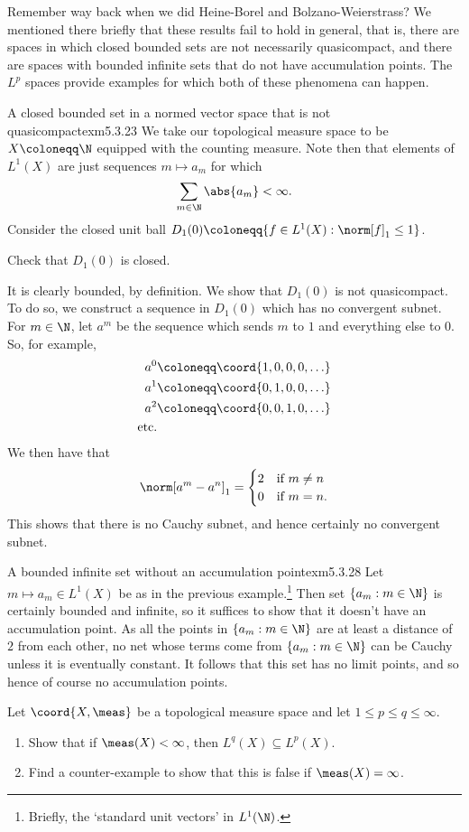 Remember way back when we did Heine-Borel and Bolzano-Weierstrass?  We mentioned there briefly that these results fail to hold in general, that is, there are spaces in which closed bounded sets are not necessarily quasicompact, and there are spaces with bounded infinite sets that do not have accumulation points.  The $L^p$ spaces provide examples for which both of these phenomena can happen.
\begin{exm}{A closed bounded set in a normed vector space that is not quasicompact}{exm5.3.23}
We take our topological measure space to be $X\coloneqq \N$ equipped with the counting measure.  Note then that elements of $L^1(X)$ are just sequences $m\mapsto a_m$ for which
\begin{equation}
\sum _{m\in \N}\abs{a_m}<\infty .
\end{equation}
Consider the closed unit ball $D_1(0)\coloneqq \{ f\in L^1(X):\norm[f]_1\leq 1\}$.
\begin{exr}[breakable=false]{}{}
Check that $D_1(0)$ is closed.
\end{exr}
It is clearly bounded, by definition.  We show that $D_1(0)$ is not quasicompact.  To do so, we construct a sequence in $D_1(0)$ which has no convergent subnet.  For $m\in \N$, let $a^m$ be the sequence which sends $m$ to $1$ and everything else to $0$.  So, for example,
\begin{equation}
\begin{aligned}
a^0 & \coloneqq \coord{1,0,0,0,\ldots} \\
a^1 & \coloneqq \coord{0,1,0,0,\ldots} \\
a^2 & \coloneqq \coord{0,0,1,0,\ldots} \\
\text{etc.} &
\end{aligned}
\end{equation}
We then have that
\begin{equation}
\norm[a^m-a^n]_1=\begin{cases}2 & \text{if }m\neq n \\ 0 & \text{if }m=n.\end{cases}
\end{equation}
This shows that there is no Cauchy subnet, and hence certainly no convergent subnet.
\end{exm}
\begin{exm}{A bounded infinite set without an accumulation point}{exm5.3.28}
Let $m\mapsto a_m\in L^1(X)$ be as in the previous example.\footnote{Briefly, the `standard unit vectors' in $L^1(\N )$.}  Then set $\{ a_m:m\in \N \}$ is certainly bounded and infinite, so it suffices to show that it doesn't have an accumulation point.  As all the points in $\{ a_m:m\in \N \}$ are at least a distance of $2$ from each other, no net whose terms come from $\{ a_m:m\in \N \}$ can be Cauchy unless it is eventually constant.  It follows that this set has no limit points, and so hence of course no accumulation points.
\end{exm}

\begin{exr}{}{}
Let $\coord{X,\meas}$ be a topological measure space and let $1\leq p\leq q\leq \infty$.
\begin{enumerate}
\item Show that if $\meas (X)<\infty$, then $L^q(X)\subseteq L^p(X)$.
\item Find a counter-example to show that this is false if $\meas (X)=\infty$.
\end{enumerate}
\end{exr}